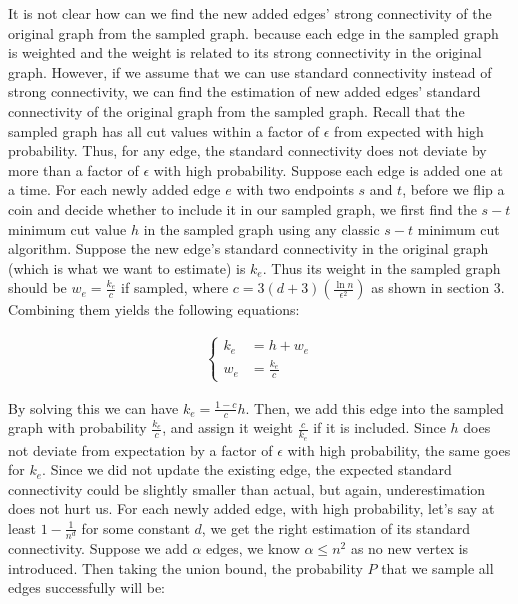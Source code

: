 \documentclass{article}
\begin{document}
\bigskip

It is not clear how can we find the new added edges' strong connectivity of the original graph from the sampled graph. because each edge in the sampled graph is weighted and the weight is related to its strong connectivity in the original graph. However, if we assume that we can use standard connectivity instead of strong connectivity, we can find the estimation of new added edges' standard connectivity of the original graph from the sampled graph. Recall that the sampled graph has all cut values within a factor of $\epsilon$ from expected with high probability. Thus, for any edge, the standard connectivity does not deviate by more than a factor of $\epsilon$ with high probability. Suppose each edge is added one at a time. For each newly added edge $e$ with two endpoints $s$ and $t$, before we flip a coin and decide whether to include it in our sampled graph, we first find the $s-t$ minimum cut value $h$ in the sampled graph using any classic $s-t$ minimum cut algorithm. Suppose the new edge's standard connectivity in the original graph (which is what we want to estimate) is $k_e$. Thus its weight in the sampled graph should be $w_e = \frac{k_e}{c}$ if sampled, where $c = 3(d+3)(\frac{\ln{n}}{\epsilon^2})$ as shown in section 3. \\

Combining them yields the following equations:

\begin{align}
    \left\{
        \begin{aligned}
            k_e &= h + w_e \\
            w_e &= \frac{k_e}{c}
        \end{aligned}
    \right.
\end{align}

By solving this we can have $k_e = \frac{1-c}{c}h$. Then, we add this edge into the sampled graph with probability $\frac{k_e}{c}$, and assign it weight $\frac{c}{k_e}$  if it is included. Since $h$ does not deviate from expectation by a factor of $\epsilon$ with high probability, the same goes for $k_e$. Since we did not update the existing edge, the expected standard connectivity could be slightly smaller than actual, but again, underestimation does not hurt us. For each newly added edge, with high probability, let's say at least $1- \frac{1}{n^d}$ for some constant $d$, we get the right estimation of its standard connectivity. Suppose we add $\alpha$ edges, we know $\alpha \leq n^2$ as no new vertex is introduced. Then taking the union bound, the probability $P$ that we sample all edges successfully will be: 
\end{document}
